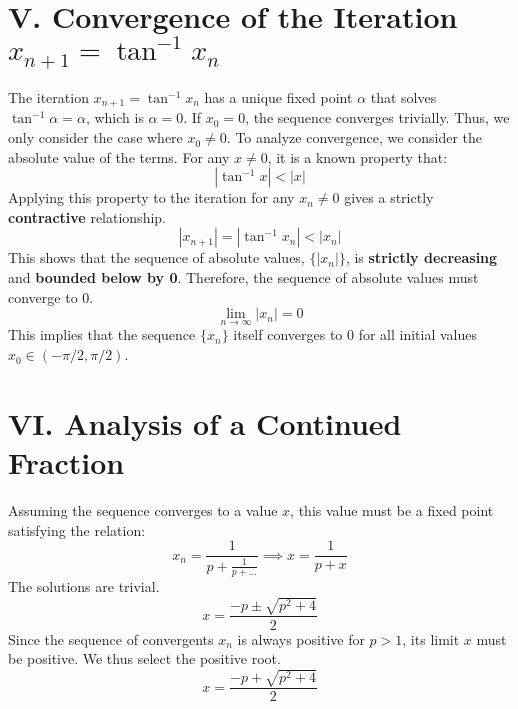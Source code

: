 \documentclass[a4paper]{article}
\begin{document}
\section*{V. Convergence of the Iteration $x_{n+1} = \tan^{-1} x_n$}

The iteration $x_{n+1} = \tan^{-1}x_n$ has a unique fixed point $\alpha$ that solves $\tan^{-1}\alpha = \alpha$, which is $\alpha=0$.
If $x_0 = 0$, the sequence converges trivially. Thus, we only consider the case where $x_0 \ne 0$.
To analyze convergence, we consider the absolute value of the terms. For any $x \ne 0$, it is a known property that:
\[
|\tan^{-1}x| < |x|
\]
Applying this property to the iteration for any $x_n \ne 0$ gives a strictly \textbf{contractive} relationship.
\[
|x_{n+1}| = |\tan^{-1}x_n| < |x_n|
\]
This shows that the sequence of absolute values, $\{|x_n|\}$, is \textbf{strictly decreasing} and \textbf{bounded below by 0}.
Therefore, the sequence of absolute values must converge to 0.
\[
\lim_{n \to \infty} |x_n| = 0
\]
This implies that the sequence $\{x_n\}$ itself converges to 0 for all initial values $x_0 \in (-\pi/2, \pi/2)$.


\section*{VI. Analysis of a Continued Fraction}

Assuming the sequence converges to a value $x$, this value must be a fixed point satisfying the relation:
\[
x_n = \frac{1}{p + \frac{1}{p + \dots}} \implies x = \frac{1}{p+x}
\]
The solutions are trivial.
\[
x = \frac{-p \pm \sqrt{p^2 + 4}}{2}
\]
Since the sequence of convergents $x_n$ is always positive for $p > 1$, its limit $x$ must be positive. We thus select the positive root.
\[
x = \frac{-p + \sqrt{p^2+4}}{2}
\]
\end{document}
